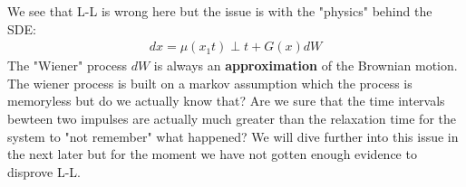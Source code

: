 \documentclass{report}
\begin{document}
We see that L-L is wrong here but the issue is with the "physics" behind the SDE:
\begin{align}
    d x=\mu\left(x_1 t\right) \perp t+G(x) d W
\end{align}
The "Wiener" process $dW$ is always an \textbf{approximation} of the Brownian motion. The wiener process is built on a markov assumption which the process is memoryless but do we actually know that? Are we sure that the time intervals bewteen two impulses are actually much greater than the relaxation time for the system to "not remember" what happened? We will dive further into this issue in the next later but for the moment we have not gotten enough evidence to disprove L-L.
\end{document}

